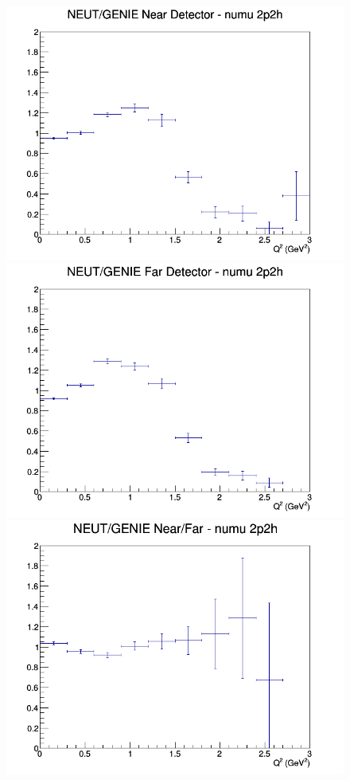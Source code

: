 \documentclass[12pt]{article}
\begin{document}
\begin{figure}[h]
\endminipage
\newline
{}
\includegraphics[width=\linewidth]{eff_Q2/FGT/ratios/2p2h_NEUT_GENIE_numu_near_Q2.png}
\endminipage
{}
\includegraphics[width=\linewidth]{eff_Q2/FGT/ratios/2p2h_NEUT_GENIE_numu_far_Q2.png}
\endminipage
{}
\includegraphics[width=\linewidth]{eff_Q2/FGT/ratios/2p2h_NEUT_GENIE_numu_NF_Q2.png}

\end{figure}
\end{document}
